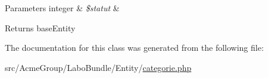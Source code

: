 \begin{DoxyParams}[1]{Parameters}
integer & {\em \$statut} & \\
\hline
\end{DoxyParams}
\begin{DoxyReturn}{Returns}
base\+Entity 
\end{DoxyReturn}


The documentation for this class was generated from the following file\+:\begin{DoxyCompactItemize}
\item 
src/\+Acme\+Group/\+Labo\+Bundle/\+Entity/\hyperlink{_labo_bundle_2_entity_2categorie_8php}{categorie.\+php}\end{DoxyCompactItemize}

